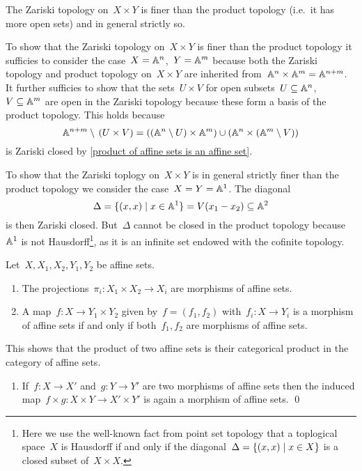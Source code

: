 \begin{warning}
  \label{zariski finer than product topology}
  The Zariski topology on~$X \times Y$ is finer than the product topology (i.e.\ it has more open sets) and in general strictly so.
  
  To show that the Zariski topology on~$X \times Y$ is finer than the product topology it sufficies to consider the case~$X = \mathbb{A}^n$,~$Y = \mathbb{A}^m$ because both the Zariski topology and product topology on~$X \times Y$ are inherited from~$\mathbb{A}^n \times \mathbb{A}^m = \mathbb{A}^{n+m}$.
  It further sufficies to show that the sets~$U \times V$ for open subsets~$U \subseteq \mathbb{A}^n$,~$V \subseteq \mathbb{A}^m$ are open in the Zariski topology because these form a basis of the product topology.
  This holds because
  \[
      \mathbb{A}^{n+m} \setminus \, (U \times V)
    = \left( (\mathbb{A}^n \setminus U) \times \mathbb{A}^m \right)
      \cup
      \left( \mathbb{A}^n \times (\mathbb{A}^m \setminus V) \right)
  \]
  is Zariski closed by \cref{product of affine sets is an affine set}.
  
  To show that the Zariski toplogy on~$X \times Y$ is in general strictly finer than the product topology we consider the case~$X = Y = \mathbb{A}^1$.
  The diagonal
  \[
              \Delta
    =         \{(x,x) \suchthat x \in \Aff^1\}
    =         V(x_1 - x_2)
    \subseteq \Aff^2
  \]
  is then Zariski closed.
  But~$\Delta$ cannot be closed in the product topology because~$\mathbb{A}^1$ is not Hausdorff\footnote{Here we use the well-known fact from point set topology that a toplogical space~$X$ is Hausdorff if and only if the diagonal~$\Delta = \{(x,x) \suchthat x \in X\}$ is a closed subset of~$X \times X$.}, as it is an infinite set endowed with the cofinite topology.
\end{warning}


\begin{proposition}
  Let~$X, X_1, X_2, Y_1, Y_2$ be affine sets.
  \begin{enumerate}
    \item
      The projections~$\pi_i \colon X_1 \times X_2 \to X_i$ are morphisms of affine sets.
    \item
      A map~$f \colon X \to Y_1 \times Y_2$ given by~$f = (f_1, f_2)$ with~$f_i \colon X \to Y_i$ is a morphism of affine sets if and only if both~$f_1, f_2$ are morphisms of affine sets.
  \end{enumerate}
  This shows that the product of two affine sets is their categorical product in the category of affine sets.
  \begin{enumerate}[resume]
    \item
      If~$f \colon X \to X'$ and~$g \colon Y \to Y'$ are two morphisms of affine sets then the induced map~$f \times g \colon X \times Y \to X' \times Y'$ is again a morphism of affine sets.
    \qed
  \end{enumerate}
\end{proposition}


